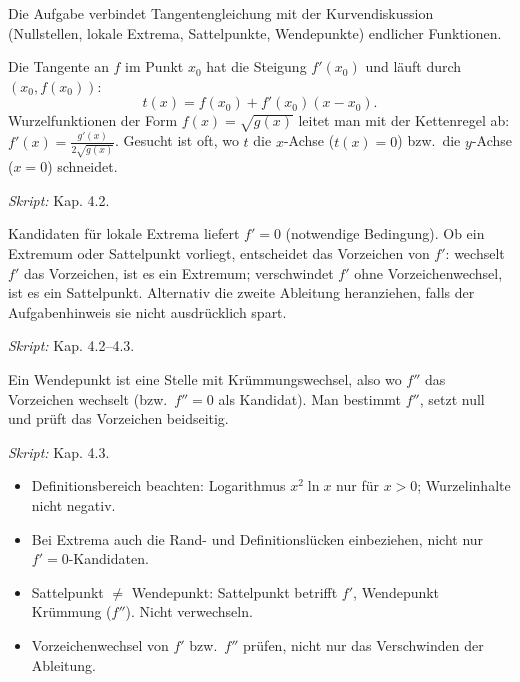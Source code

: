

Die Aufgabe verbindet Tangentengleichung mit der Kurvendiskussion (Nullstellen,
lokale Extrema, Sattelpunkte, Wendepunkte) endlicher Funktionen.

\begin{werkzeugkasten}[Tangentengleichung]
Die Tangente an $f$ im Punkt $x_0$ hat die Steigung $f'(x_0)$ und läuft durch
$(x_0,f(x_0))$:
\begin{equation}
  t(x)=f(x_0)+f'(x_0)(x-x_0).
\end{equation}
Wurzelfunktionen der Form $f(x)=\sqrt{g(x)}$ leitet man mit der Kettenregel ab:
$f'(x)=\frac{g'(x)}{2\sqrt{g(x)}}$. Gesucht ist oft, wo $t$ die $x$-Achse
($t(x)=0$) bzw.\ die $y$-Achse ($x=0$) schneidet.

\textit{Skript:} Kap. 4.2.
\end{werkzeugkasten}

\begin{werkzeugkasten}
Kandidaten für lokale Extrema liefert $f'=0$ (notwendige Bedingung). Ob ein
Extremum oder Sattelpunkt vorliegt, entscheidet das Vorzeichen von $f'$:
wechselt $f'$ das Vorzeichen, ist es ein Extremum; verschwindet $f'$ ohne
Vorzeichenwechsel, ist es ein Sattelpunkt. Alternativ die zweite Ableitung
heranziehen, falls der Aufgabenhinweis sie nicht ausdrücklich spart.

\textit{Skript:} Kap. 4.2--4.3.
\end{werkzeugkasten}

\begin{werkzeugkasten}[Wendepunkte]
Ein Wendepunkt ist eine Stelle mit Krümmungswechsel, also wo $f''$ das
Vorzeichen wechselt (bzw.\ $f''=0$ als Kandidat). Man bestimmt $f''$, setzt
null und prüft das Vorzeichen beidseitig.

\textit{Skript:} Kap. 4.3.
\end{werkzeugkasten}

\begin{achtung}
\begin{itemize}
  \item Definitionsbereich beachten: Logarithmus $x^2\ln x$ nur für $x>0$;
        Wurzelinhalte nicht negativ.
  \item Bei Extrema auch die Rand- und Definitionslücken einbeziehen, nicht nur
        $f'=0$-Kandidaten.
  \item Sattelpunkt $\neq$ Wendepunkt: Sattelpunkt betrifft $f'$, Wendepunkt
        Krümmung ($f''$). Nicht verwechseln.
  \item Vorzeichenwechsel von $f'$ bzw.\ $f''$ prüfen, nicht nur das
        Verschwinden der Ableitung.
\end{itemize}
\end{achtung}
